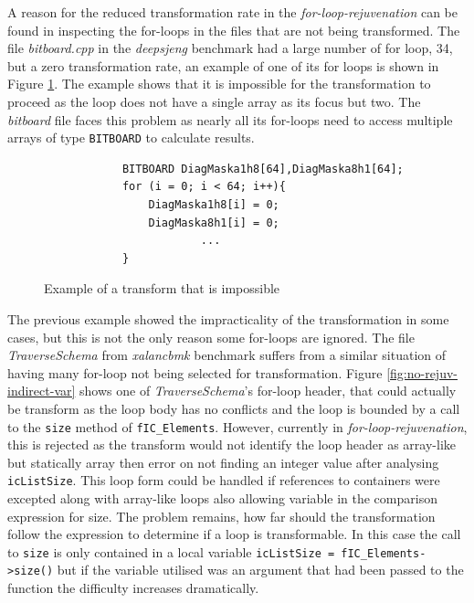 \documentclass[bsc,frontabs,singlespacing,twoside,parskip,deptreport]{infthesis}
\begin{document}
A reason for the reduced transformation rate in the \textit{for-loop-rejuvenation} can be found in inspecting the for-loops in the files that are not being transformed. The file \textit{bitboard.cpp} in the \textit{deepsjeng} benchmark had a large number of for loop, 34, but a zero transformation rate, an example of one of its for loops is shown in Figure \ref{fig:code-untrans-example}. The example shows that it is impossible for the transformation to proceed as the loop does not have a single array as its focus but two. The \textit{bitboard} file faces this problem as nearly all its for-loops need to access multiple arrays of type \texttt{BITBOARD} to calculate results.

\begin{figure}[!ht]
    \centering
    \begin{verbatim}
            BITBOARD DiagMaska1h8[64],DiagMaska8h1[64];
            for (i = 0; i < 64; i++){
                DiagMaska1h8[i] = 0;
                DiagMaska8h1[i] = 0;
                        ...
            }
    \end{verbatim}
    \caption{Example of a transform that is impossible}
    \label{fig:code-untrans-example}
\end{figure}

The previous example showed the impracticality of the transformation in some cases, but this is not the only reason some for-loops are ignored. The file \textit{TraverseSchema} from \textit{xalancbmk} benchmark suffers from a similar situation of having many for-loop not being selected for transformation. Figure \ref{fig:no-rejuv-indirect-var} shows one of \textit{TraverseSchema}'s for-loop header, that could actually be transform as the loop body has no conflicts and the loop is bounded by a call to the \texttt{size} method of \texttt{fIC\_Elements}. However, currently in \textit{for-loop-rejuvenation}, this is rejected as the transform would not identify the loop header as array-like but statically array then error on not finding an integer value after analysing \texttt{icListSize}. This loop form could be handled if references to containers were excepted along with array-like loops also allowing variable in the comparison expression for size. The problem remains, how far should the transformation follow the expression to determine if a loop is transformable. In this case the call to \texttt{size} is only contained in a local variable \texttt{icListSize = fIC\_Elements->size()} but if the variable utilised was an argument that had been passed to the function the difficulty increases dramatically. 
\end{document}
